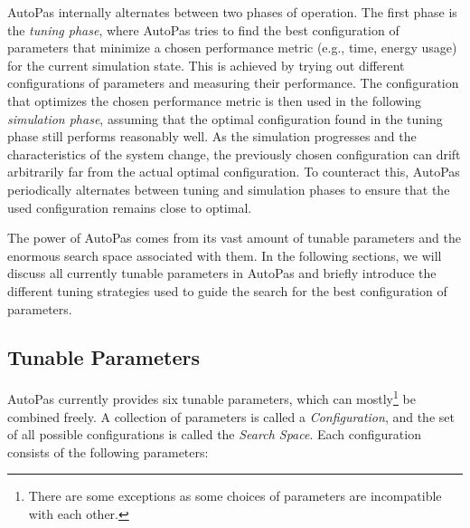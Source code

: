 AutoPas internally alternates between two phases of operation. The first phase is the \emph{tuning phase}, where AutoPas tries to find the best configuration of parameters that minimize a chosen performance metric (e.g., time, energy usage) for the current simulation state. This is achieved by trying out different configurations of parameters and measuring their performance. The configuration that optimizes the chosen performance metric is then used in the following \emph{simulation phase}, assuming that the optimal configuration found in the tuning phase still performs reasonably well.
As the simulation progresses and the characteristics of the system change, the previously chosen configuration can drift arbitrarily far from the actual optimal configuration. To counteract this, AutoPas periodically alternates between tuning and simulation phases to ensure that the used configuration remains close to optimal.

The power of AutoPas comes from its vast amount of tunable parameters and the enormous search space associated with them. In the following sections, we will discuss all currently tunable parameters in AutoPas and briefly introduce the different tuning strategies used to guide the search for the best configuration of parameters.

\subsection{Tunable Parameters}

AutoPas currently provides six tunable parameters, which can mostly\footnote{There are some exceptions as some choices of parameters are incompatible with each other.} be combined freely. A collection of parameters is called a \emph{Configuration}, and the set of all possible configurations is called the \emph{Search Space}. Each configuration consists of the following parameters:

